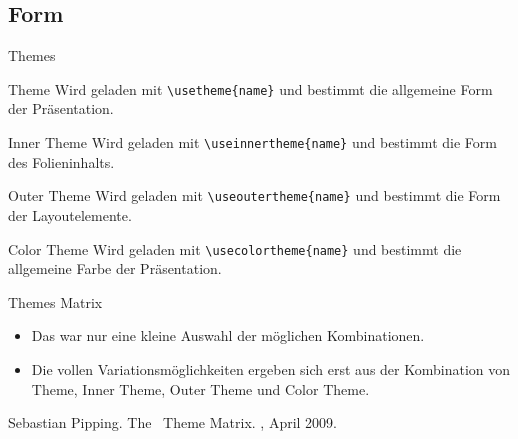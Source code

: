 
\subsection{Form}

\begin{Frame}[fragile]{Themes}
  \begin{Block}{Theme}
    Wird geladen mit \lstinline-\usetheme{name}- und bestimmt die
    \alert{allgemeine Form} der Präsentation.
  \end{Block}

  \begin{Block}{Inner Theme}
    Wird geladen mit \lstinline-\useinnertheme{name}- und bestimmt
    die \alert{Form des Folieninhalts}.
  \end{Block}

  \begin{Block}{Outer Theme}
    Wird geladen mit \lstinline-\useoutertheme{name}- und bestimmt
    die \alert{Form der Layoutelemente}.
  \end{Block}

  \begin{Block}{Color Theme}
    Wird geladen mit \lstinline-\usecolortheme{name}- und bestimmt
    die \alert{allgemeine Farbe} der Präsentation.
  \end{Block}
\end{Frame}








\begin{Frame}{Themes Matrix}
  \begin{itemize}
    \item Das war nur eine kleine Auswahl der möglichen Kombinationen.
    \item Die vollen Variationsmöglichkeiten ergeben sich erst aus der
      Kombination von Theme, Inner Theme, Outer Theme und Color Theme.
  \end{itemize}

  \xxx

  \begin{mybib}
      Sebastian Pipping.
      \newblock The \beamer\ Theme Matrix.
      \newblock {}, April 2009.
  \end{mybib}
\end{Frame}

